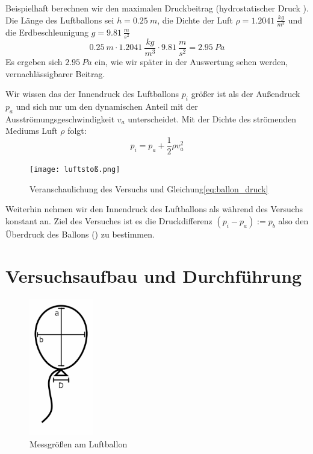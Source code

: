 \documentclass{article}
\begin{document}
    Beispielhaft berechnen wir den maximalen Druckbeitrag (hydrostatischer Druck \cite{Luftdruck}).
    Die Länge des Luftballons sei \(h = \SI{0.25}{m}\), die Dichte der Luft \(\rho = \SI{1.2041}{\frac{kg}{m^3}} \)\cite{Aufgabenstellung}
    und die Erdbeschleunigung \(g = \SI{9.81}{\frac{m}{s^2}} \)
    \begin{equation}
        \SI{0.25}{m} \cdot \SI{1.2041}{\frac{kg}{m^3}} \cdot \SI{9.81}{\frac{m}{s^2}} = \SI{2.95}{Pa} %
    \end{equation}
    Es ergeben sich \(\SI{2.95}{Pa}\) ein, wie wir später in der Auswertung sehen werden, vernachlässigbarer Beitrag.

    Wir wissen das der Innendruck des Luftballons \(p_i\) größer ist als der Außendruck \(p_a\)
    und sich nur um den dynamischen Anteil mit der Ausströmungsgeschwindigkeit \(v_a\) unterscheidet. Mit der Dichte des strömenden Mediums Luft \( \rho \) folgt: 
    \begin{equation} \label{eq:ballon_druck}
        p_i = p_a + \frac{1}{2} \rho v_a^2
    \end{equation}
    \begin{figure}[h]\label{fig:luftstoss}
        \centering
        \texttt{[image: luftstoß.png]}
        \caption{Veranschaulichung des Versuchs und Gleichung\ref{eq:ballon_druck}}
    \end{figure}

    Weiterhin nehmen wir den Innendruck des Luftballons als während des Versuchs konstant an.
    Ziel des Versuches ist es die Druckdifferenz \( (p_i - p_a) := p_b \) also den Überdruck des Ballons (\cite{Überdruck}) zu bestimmen.

    \section{Versuchsaufbau und Durchführung}
    
    \begin{figure}[h]\label{fig:messungen}
        \centering
        \includegraphics[height=6cm]{luftballons.png}
        \caption{Messgrößen am Luftballon}
    \end{figure}
\end{document}

